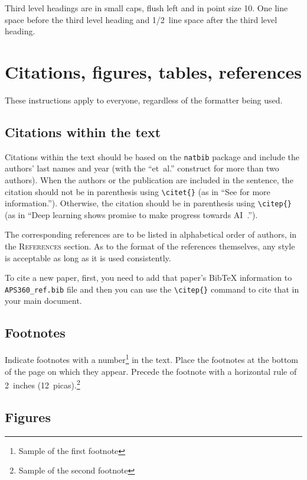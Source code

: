 \documentclass{article} %
\begin{document}
Third level headings are in small caps,
flush left and in point size 10. One line space before the third level
heading and 1/2~line space after the third level heading.

\section{Citations, figures, tables, references}
\label{others}

These instructions apply to everyone, regardless of the formatter being used.

\subsection{Citations within the text}

Citations within the text should be based on the \texttt{natbib} package
and include the authors' last names and year (with the ``et~al.'' construct
for more than two authors). When the authors or the publication are
included in the sentence, the citation should not be in parenthesis using \verb|\citet{}| (as
in ``See \citet{Hinton06} for more information.''). Otherwise, the citation
should be in parenthesis using \verb|\citep{}| (as in ``Deep learning shows promise to make progress
towards AI~\citep{Bengio+chapter2007}.'').

The corresponding references are to be listed in alphabetical order of
authors, in the \textsc{References} section. As to the format of the
references themselves, any style is acceptable as long as it is used
consistently.

To cite a new paper, first, you need to add that paper's BibTeX information to \verb+APS360_ref.bib+ file and then you can use the \verb|\citep{}| command to cite that in your main document. 

\subsection{Footnotes}

Indicate footnotes with a number\footnote{Sample of the first footnote} in the
text. Place the footnotes at the bottom of the page on which they appear.
Precede the footnote with a horizontal rule of 2~inches
(12~picas).\footnote{Sample of the second footnote}

\subsection{Figures}
\end{document}

